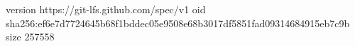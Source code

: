 version https://git-lfs.github.com/spec/v1
oid sha256:ef6e7d7724645b68f1bddec05e9508e68b3017df5851fad09314684915eb7c9b
size 257558
